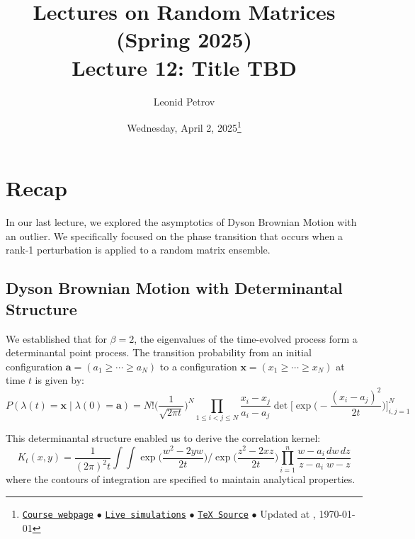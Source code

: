 \documentclass[letterpaper,11pt,oneside,reqno]{article}
\numberwithin{equation}{section}
\theoremstyle{definition}
\begin{document}
\title{Lectures on Random Matrices
(Spring 2025)
\\Lecture 12: Title TBD}


\date{Wednesday, April 2, 2025\footnote{\href{https://lpetrov.cc/rmt25/}{\texttt{Course webpage}}
$\bullet$ \href{https://lpetrov.cc/simulations/model/random-matrices/}{\texttt{Live simulations}}
$\bullet$ \href{https://lpetrov.cc/rmt25/rmt25-notes/rmt2025-l12.tex}{\texttt{TeX Source}}
$\bullet$
Updated at \currenttime, \today}}



\author{Leonid Petrov}


\maketitle
\tableofcontents


\section{Recap}

In our last lecture, we explored the asymptotics of Dyson Brownian Motion with an outlier. We specifically focused on the phase transition that occurs when a rank-1 perturbation is applied to a random matrix ensemble.

\subsection{Dyson Brownian Motion with Determinantal Structure}

We established that for $\beta=2$, the eigenvalues of the time-evolved process form a determinantal point process. The transition probability from an initial configuration $\mathbf{a} = (a_1 \geq \cdots \geq a_N)$ to a configuration $\mathbf{x} = (x_1 \geq \cdots \geq x_N)$ at time $t$ is given by:
\begin{equation*}
P(\lambda(t) = \mathbf{x} \mid \lambda(0) = \mathbf{a}) = N! \Big(\frac{1}{\sqrt{2\pi t}}\Big)^N \prod_{1\leq i<j\leq N}\frac{x_i - x_j}{a_i - a_j} \det\Big[\exp\Big(-\frac{(x_i - a_j)^2}{2t}\Big)\Big]_{i,j=1}^N
\end{equation*}

This determinantal structure enabled us to derive the correlation kernel:
\begin{equation}\label{eq:correlation-kernel}
K_t(x,y) = \frac{1}{(2\pi)^2 t} \int\int \exp\Big(\frac{w^2 - 2yw}{2t}\Big) \bigg/ \exp\Big(\frac{z^2 - 2xz}{2t}\Big) \prod_{i=1}^n \frac{w-a_i}{z-a_i} \frac{dw\,dz}{w-z}
\end{equation}
where the contours of integration are specified to maintain analytical properties.
\end{document}
